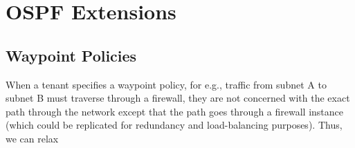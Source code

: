 \section{OSPF Extensions}
\subsection{Waypoint Policies}
When a tenant specifies a waypoint policy, for e.g., traffic from
subnet A to subnet B must traverse through a firewall, they are not
concerned with the exact path through the network except that the 
path goes through a firewall instance (which could be replicated for
redundancy and load-balancing purposes). Thus, we can relax 
